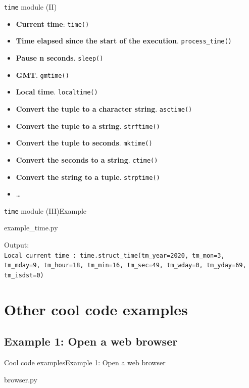 \documentclass[10pt,compress]{beamer} %
\begin{document}
\begin{frame}{\texttt{time} module (II)}

\begin{block}{}
\footnotesize{
\begin{itemize}			
\item \textbf{Current time}: \texttt{time()}
\item \textbf{Time elapsed since the start of the execution}. \texttt{process\_time()}
\item \textbf{Pause n seconds}. \texttt{sleep()}
\item \textbf{GMT}. \texttt{gmtime()}
\item \textbf{Local time}. \texttt{localtime()}
\item \textbf{Convert the tuple to a character string}. \texttt{asctime()}
\item \textbf{Convert the tuple to a string}. \texttt{strftime()}
\item \textbf{Convert the tuple to seconds}. \texttt{mktime()}
\item \textbf{Convert the seconds to a string}. \texttt{ctime()}
\item \textbf{Convert the string to a tuple}. \texttt{strptime()}
\item \ldots
\end{itemize}
}
\end{block}	
\end{frame}

\begin{frame}{\texttt{time} module (III)}{Example}

\vspace{-0.2cm}
	\begin{block}{example\_time.py}

	

	\end{block}
Output:\\
\small{\texttt{Local current time : time.struct_time(tm_year=2020, tm_mon=3, tm_mday=9, tm_hour=18, tm_min=16, tm_sec=49, tm_wday=0, tm_yday=69, tm_isdst=0)}}
\end{frame}



\section{Other cool code examples}

\subsection{Example 1: Open a web browser}
\begin{frame}{Cool code examples}{Example 1: Open a web browser}
	\vspace{-0.2cm}
	\begin{block}{browser.py}
	\vspace{-0.2cm}
	
	\vspace{-0.2cm}
	\end{block}
\end{frame}
\end{document}
